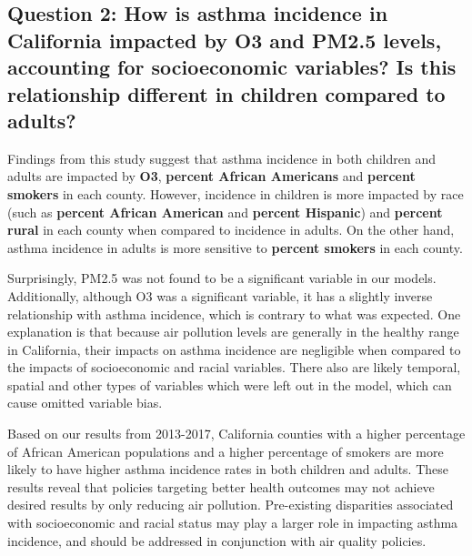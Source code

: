 \documentclass[12pt,]{article}
\begin{document}
\hypertarget{question-2-how-is-asthma-incidence-in-california-impacted-by-o3-and-pm2.5-levels-accounting-for-socioeconomic-variables-is-this-relationship-different-in-children-compared-to-adults}{%
\subsection{\texorpdfstring{\textbf{Question 2:} How is asthma incidence
in California impacted by O3 and PM2.5 levels, accounting for
socioeconomic variables? Is this relationship different in children
compared to
adults?}{Question 2: How is asthma incidence in California impacted by O3 and PM2.5 levels, accounting for socioeconomic variables? Is this relationship different in children compared to adults?}}\label{question-2-how-is-asthma-incidence-in-california-impacted-by-o3-and-pm2.5-levels-accounting-for-socioeconomic-variables-is-this-relationship-different-in-children-compared-to-adults}}

Findings from this study suggest that asthma incidence in both children
and adults are impacted by \textbf{O3}, \textbf{percent African
Americans} and \textbf{percent smokers} in each county. However,
incidence in children is more impacted by race (such as \textbf{percent
African American} and \textbf{percent Hispanic}) and \textbf{percent
rural} in each county when compared to incidence in adults. On the other
hand, asthma incidence in adults is more sensitive to \textbf{percent
smokers} in each county.

Surprisingly, PM2.5 was not found to be a significant variable in our
models. Additionally, although O3 was a significant variable, it has a
slightly inverse relationship with asthma incidence, which is contrary
to what was expected. One explanation is that because air pollution
levels are generally in the healthy range in California, their impacts
on asthma incidence are negligible when compared to the impacts of
socioeconomic and racial variables. There also are likely temporal,
spatial and other types of variables which were left out in the model,
which can cause omitted variable bias.

Based on our results from 2013-2017, California counties with a higher
percentage of African American populations and a higher percentage of
smokers are more likely to have higher asthma incidence rates in both
children and adults. These results reveal that policies targeting better
health outcomes may not achieve desired results by only reducing air
pollution. Pre-existing disparities associated with socioeconomic and
racial status may play a larger role in impacting asthma incidence, and
should be addressed in conjunction with air quality policies.
\end{document}

